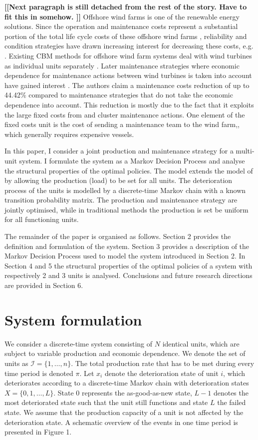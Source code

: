 \documentclass[a4paper,12pt]{article}
\begin{document}
\textbf{[[Next paragraph is still detached from the rest of the story. Have to fit this in somehow. ]]}
Offshore wind farms is one of the renewable energy solutions. Since the operation and maintenance costs represent a substantial portion of the total life cycle costs of these offshore wind farms \cite{hau2003wind}, reliability and condition strategies have drawn increasing interest for decreasing these costs, e.g. \cite{krokoszinski2003efficiency}. Existing CBM methods for offshore wind farm systems deal with wind turbines as individual units separately \citep{avner2007reliability}. Later maintenance strategies where economic dependence for maintenance actions between wind turbines is taken into account have gained interest \citep{tian2011condition}. The authors claim a maintenance costs reduction of up to 44.42\% compared to maintenance strategies that do not take the economic dependence into account. This reduction is mostly due to the fact that it exploits the large fixed costs from and cluster maintenance actions. One element of the fixed costs unit is the cost of sending a maintenance team to the wind farm,, which generally requires expensive vessels.

In this paper, I consider a joint production and maintenance strategy for a multi-unit system. I formulate the system as a Markov Decision Process and analyse the structural properties of the optimal policies. The model extends the model of \cite{OLDEKEIZER2018319} by allowing the production (load) to be set for all units. The deterioration process of the units is modelled by a discrete-time Markov chain with a known transition probability matrix. The production and maintenance strategy are jointly optimised, while in traditional methods the production is set be uniform for all functioning units. 

The remainder of the paper is organised as follows. Section 2 provides the definition and formulation of the system. Section 3 provides a description of the Markov Decision Process used to model the system introduced in Section 2. In Section 4 and 5 the structural properties of the optimal policies of a system with respectively 2 and 3 units is analysed. Conclusions and future research directions are provided in Section 6.


\section{System formulation}
We consider a discrete-time system consisting of $N$ identical units, which are subject to variable production and economic dependence. We denote the set of units as $\mathcal{I} = \{1, \dots, n\}$. The total production rate that has to be met during every time period is denoted $\pi$.  Let $x_i$ denote the deterioration state of unit $i$, which deteriorates according to a discrete-time Markov chain with deterioration states $X = \{0, 1, \dots, L\}$. State $0$ represents the as-good-as-new state, $L-1$ denotes the most deteriorated state such that the unit still functions and state $L$ the failed state. We assume that the production capacity of a unit is not affected by the deterioration state. A schematic overview of the events in one time period is presented in Figure 1.
\end{document}
